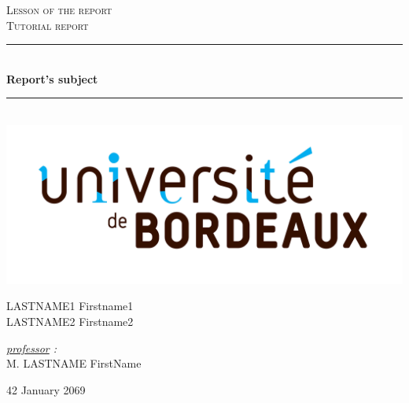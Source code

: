 \documentclass{article}
\newcommand{\HRule}{\rule{\linewidth}{0.5mm}}
\begin{document}
\begin{titlepage}
  \begin{sffamily}
  \begin{center}

    \textsc{\LARGE Lesson of the report}\\[2cm]

    \textsc{\Large Tutorial report}\\[1.5cm]

    \HRule \\[0.4cm]
    { \huge \bfseries Report's subject\\[0.4cm] }

    \HRule \\[1cm]
    \includegraphics[scale=0.07]{img/logoUB.jpg}
    \\[2cm]

    \begin{minipage}{0.4\textwidth}
      \begin{flushleft} \large
        \textsc{LASTNAME1} Firstname1\\
        \textsc{LASTNAME2} Firstname2\\
      \end{flushleft}
    \end{minipage}
    \begin{minipage}{0.4\textwidth}
      \begin{flushright} \large
        \emph{\underline{professor} :}\\ M. \textsc{LASTNAME} FirstName\\
      \end{flushright}
    \end{minipage}

    \vfill

    {\large 42 January 2069}

  \end{center}
  \end{sffamily}
\end{titlepage}
\end{document}
